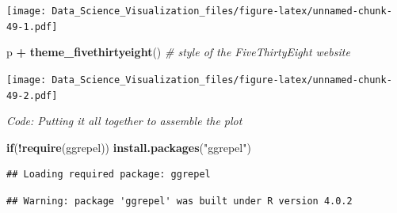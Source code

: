 \documentclass[
]{article}
\newenvironment{Shaded}{\begin{snugshade}}{\end{snugshade}}
\newcommand{\CommentTok}[1]{\textcolor[rgb]{0.56,0.35,0.01}{\textit{#1}}}
\newcommand{\ControlFlowTok}[1]{\textcolor[rgb]{0.13,0.29,0.53}{\textbf{#1}}}
\newcommand{\KeywordTok}[1]{\textcolor[rgb]{0.13,0.29,0.53}{\textbf{#1}}}
\newcommand{\NormalTok}[1]{#1}
\newcommand{\OperatorTok}[1]{\textcolor[rgb]{0.81,0.36,0.00}{\textbf{#1}}}
\newcommand{\StringTok}[1]{\textcolor[rgb]{0.31,0.60,0.02}{#1}}
\begin{document}
\texttt{[image: Data\_Science\_Visualization\_files/figure-latex/unnamed-chunk-49-1.pdf]}

\begin{Shaded}
\begin{Highlighting}[]
\NormalTok{p }\OperatorTok{+}\StringTok{ }\KeywordTok{theme_fivethirtyeight}\NormalTok{()    }\CommentTok{# style of the FiveThirtyEight website}
\end{Highlighting}
\end{Shaded}

\texttt{[image: Data\_Science\_Visualization\_files/figure-latex/unnamed-chunk-49-2.pdf]}

\emph{Code: Putting it all together to assemble the plot}

\begin{Shaded}
\begin{Highlighting}[]
\ControlFlowTok{if}\NormalTok{(}\OperatorTok{!}\KeywordTok{require}\NormalTok{(ggrepel)) }\KeywordTok{install.packages}\NormalTok{(}\StringTok{"ggrepel"}\NormalTok{)}
\end{Highlighting}
\end{Shaded}

\begin{verbatim}
## Loading required package: ggrepel
\end{verbatim}

\begin{verbatim}
## Warning: package 'ggrepel' was built under R version 4.0.2
\end{verbatim}
\end{document}
